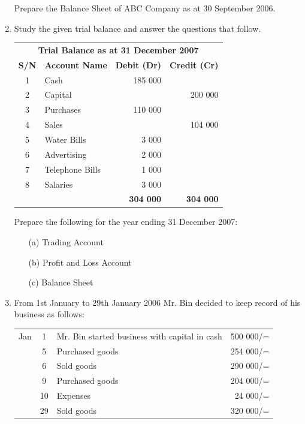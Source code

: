 \begin{enumerate}
Prepare the Balance Sheet of ABC Company as at 30 September 2006.


\item Study the given trial balance and answer the questions that follow.

\begin{center}
\begin{tabular}{|c|l|r|r|}
\multicolumn{4}{c}{\textbf{Trial Balance as at 31 December 2007}} \\\cline{1-4}
\textbf{S/N} &\multicolumn{1}{c|}{\textbf{Account Name}}&\multicolumn{1}{c|}{\textbf{Debit (Dr)}} & \multicolumn{1}{c|}{\textbf{Credit (Cr)}}\\ \cline{1-4}
1 & Cash  & 185 000 &  \\
2 & Capital &  & 200 000 \\
3 & Purchases & 110 000 &  \\
4 & Sales &  & 104 000 \\
5 & Water Bills & 3 000 &  \\
6 & Advertising & 2 000 &  \\
7 & Telephone Bills & 1 000 &  \\
8 & Salaries & 3 000 &  \\
\cline{1-4}
& & \textbf{304 000} & \textbf{304 000}\\ \cline{1-4}
\end{tabular}
\label{tab:prob2_tb}
\end{center}

Prepare the following for the year ending 31 December 2007:
\begin{itemize}
\item[(a)] Trading Account
\item[(b)] Profit and Loss Account
\item[(c)] Balance Sheet
\end{itemize}



\item From 1st January to 29th January 2006 Mr. Bin decided to keep record of his business as follows:\\

\begin{tabular}{c c l r}
Jan & 1 & Mr. Bin started business with capital in cash & 500 000/=\\
& 5 & Purchased goods & 254 000/=\\
& 6 & Sold goods & 290 000/=\\
& 9 & Purchased goods & 204 000/=\\
& 10 & Expenses & 24 000/=\\
& 29 & Sold goods & 320 000/=\\
\end{tabular}\\
\label{prob3_trans}


\end{enumerate}
